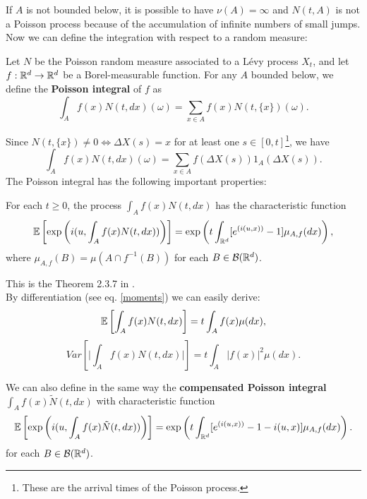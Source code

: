 If $A$ is not bounded below, it is possible to have $\nu(A) = \infty$ and $N(t,A)$ is not a Poisson process because of the accumulation of infinite numbers of
small jumps.
\vspace{2em}
Now we can define the integration with respect to a random measure:
\begin{Definition} \label{Poisson_int}
 Let $N$ be the Poisson random measure associated to a Lévy process $X_t$, and let $f:\mathbb{R}^d \to \mathbb{R}^d$ be a Borel-measurable
 function. For any $A$ bounded below, we define the \textbf{Poisson integral} of $f$ as
 \begin{equation}
  \int_A f(x) N(t,dx)(\omega) = \sum_{x\in A} f(x) N(t,\{x\})(\omega). 
 \end{equation}
\end{Definition}
Since $N(t,\{x\}) \neq 0 \Leftrightarrow \Delta X(s)=x$ for at least one $s\in [0,t]$\footnote{These are the arrival 
times of the Poisson process.}, we have  
 \begin{equation}
  \int_A f(x) N(t,dx)(\omega) = \sum_{x\in A} f(\Delta X(s)) 1_A(\Delta X(s)). 
 \end{equation}
The Poisson integral has the following important properties: 
\begin{Theorem}
 For each $t\geq 0$, the process $\int_A f(x) N(t,dx)$ has the characteristic function
 \begin{equation}
  \mathbb{E} \left[ \exp \left( i(u,\int_A f(x) N(t,dx)) \right) \right] = 
  \exp \left( t \int_{\mathbb{R}^d} [e^{(i(u,x))}-1] \mu_{A,f}(dx) \right),
 \end{equation}
where $\mu_{A,f}(B) = \mu(A \cap f^{-1}(B))$ for each $B \in \mathcal{B}(\mathbb{R}^d)$.
\end{Theorem}
This is the Theorem 2.3.7 in \cite{Applebaum}.\\
By differentiation (see eq. \ref{moments}) we can easily derive:
\begin{equation}\label{Exp_poiss}
 \mathbb{E} \left[ \int_A f(x) N(t,dx) \right] = t \int_A f(x) \mu(dx),
\end{equation}
\begin{equation}
 Var \left[ \biggr|\int_A f(x) N(t,dx)\biggr|\right] = t \int_A |f(x)|^2 \mu(dx).
\end{equation}

We can also define in the same way the \textbf{compensated Poisson integral} 
$\int_A f(x) \tilde{N}(t,dx)$
with characteristic function
\begin{equation}
  \mathbb{E} \left[ \exp \left( i(u,\int_A f(x) \tilde{N}(t,dx)) \right) \right] = 
  \exp \left( t \int_{\mathbb{R}^d} [e^{(i(u,x))}-1-i(u,x)] \mu_{A,f}(dx) \right).
\end{equation}
for each $B \in \mathcal{B}(\mathbb{R}^d)$.
 
